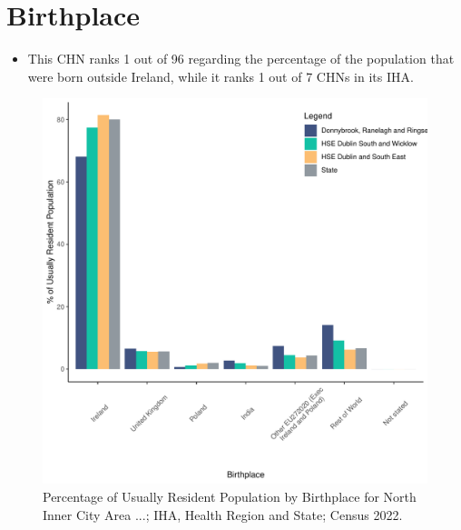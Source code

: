 \documentclass{article}
\begin{document}
\section{Birthplace}\label{sect:Birth}
\begin{itemize}
\item This CHN ranks  1 out of 96 regarding the percentage of the population that were born outside Ireland, while it ranks  1 out of 7 CHNs in its IHA.
\end{itemize}
\begin{figure}[H]
	\centering
	\includegraphics[width = 130mm]{../figures/BirthED.pdf}
	\caption{Percentage of Usually Resident Population by Birthplace for North Inner City Area ...; IHA, Health Region and State; Census 2022.}
	\label{fig:vbnv}
	\end{figure}
	
\end{document}
